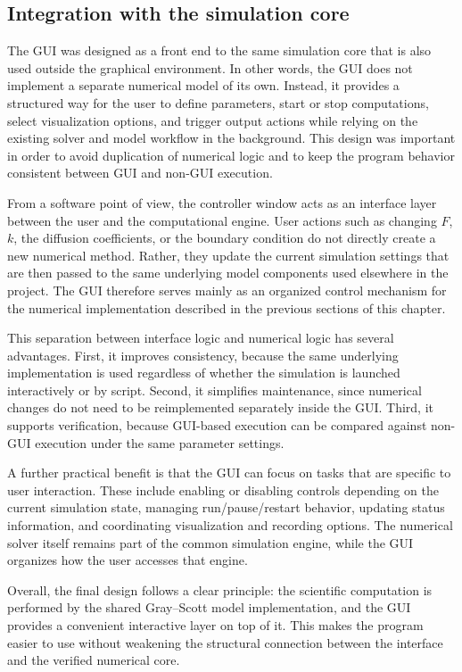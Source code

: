 \subsection{Integration with the simulation core}
\label{subsec:gui_integration}

The GUI was designed as a front end to the same simulation core that is also used outside the graphical environment. In other words, the GUI does not implement a separate numerical model of its own. Instead, it provides a structured way for the user to define parameters, start or stop computations, select visualization options, and trigger output actions while relying on the existing solver and model workflow in the background. This design was important in order to avoid duplication of numerical logic and to keep the program behavior consistent between GUI and non-GUI execution.

From a software point of view, the controller window acts as an interface layer between the user and the computational engine. User actions such as changing \(F\), \(k\), the diffusion coefficients, or the boundary condition do not directly create a new numerical method. Rather, they update the current simulation settings that are then passed to the same underlying model components used elsewhere in the project. The GUI therefore serves mainly as an organized control mechanism for the numerical implementation described in the previous sections of this chapter.

This separation between interface logic and numerical logic has several advantages. First, it improves consistency, because the same underlying implementation is used regardless of whether the simulation is launched interactively or by script. Second, it simplifies maintenance, since numerical changes do not need to be reimplemented separately inside the GUI. Third, it supports verification, because GUI-based execution can be compared against non-GUI execution under the same parameter settings.

A further practical benefit is that the GUI can focus on tasks that are specific to user interaction. These include enabling or disabling controls depending on the current simulation state, managing run/pause/restart behavior, updating status information, and coordinating visualization and recording options. The numerical solver itself remains part of the common simulation engine, while the GUI organizes how the user accesses that engine.

Overall, the final design follows a clear principle: the scientific computation is performed by the shared Gray--Scott model implementation, and the GUI provides a convenient interactive layer on top of it. This makes the program easier to use without weakening the structural connection between the interface and the verified numerical core.